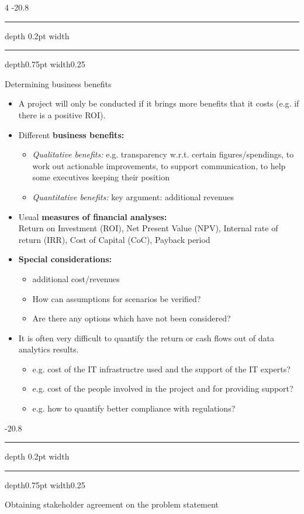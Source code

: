 \documentclass[a4paper, landscape, 6pt, fleqn]{scrartcl}
\makeatletter
\renewcommand{\emph}[1]{\textbf{#1}}
\renewcommand{\subsection}{\@startsection{subsection}{1}{0mm}%
{-2\baselineskip}{0.8\baselineskip}%
{\hrule depth 0.2pt width\columnwidth\hrule depth0.75pt
width0.25\columnwidth\vspace*{1.2em}\large\bfseries}}
\makeatother
\begin{document}
\begin{multicols*}{4}
\subsection{Determining business benefits}

\begin{itemize}
\item A project will only be conducted if it brings more benefits that it costs (e.g. if there is a positive ROI).
\item Different \emph{business benefits:}
\begin{itemize}
\item \textit{Qualitative benefits:} e.g. transparency w.r.t. certain figures/spendings, to work out actionable improvements, to support communication, to help some executives keeping their position
\item \textit{Quantitative benefits:} key argument: additional revenues
\end{itemize}
\item Usual \emph{measures of financial analyses:} \\
Return on Investment (ROI), Net Present Value (NPV), Internal rate of return (IRR), Cost of Capital (CoC), Payback period
\item \emph{Special considerations:}
\begin{itemize}
\item additional cost/revenues
\item How can assumptions for scenarios be verified?
\item Are there any options which have not been considered?
\end{itemize}
\item It is often very difficult to quantify the return or cash flows out of data analytics results.
\begin{itemize}
\item e.g. cost of the IT infrastructre used and the support of the IT experts?
\item e.g. cost of the people involved in the project and for providing support?
\item e.g. how to quantify better compliance with regulations?
\end{itemize}
\end{itemize}

\subsection{Obtaining stakeholder agreement on the problem statement}


\end{multicols*}
\end{document}
